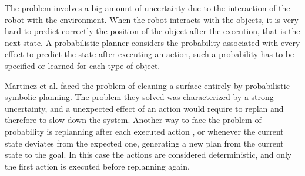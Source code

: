 The problem involves a big amount of uncertainty due to the interaction of the robot with the environment. When the robot interacts with the objects, it is very hard to predict correctly the position of the object after the execution, that is the next state. A probabilistic planner considers the probability associated with every effect to predict the state after executing an action, such a probability has to be specified or learned for each type of object.

Martinez et al. \citep{martinez2015planning} faced the problem of cleaning a surface entirely by probabilistic symbolic planning. The problem they solved was characterized by a strong uncertainty, and a unexpected effect of an action would require to replan and therefore to slow down the system.
Another way to face the problem of probability is replanning after each executed action \cite{kaelbling2012unifying}, or whenever the current state deviates from the expected one, generating a new plan from the current state to the goal. In this case the actions are considered deterministic, and only the first action is executed before replanning again. 

